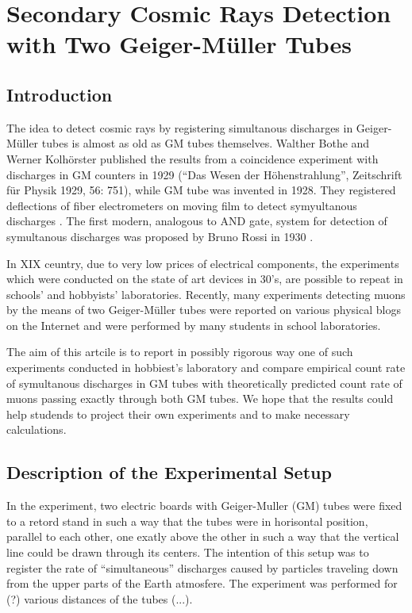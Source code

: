 \documentclass[main.tex]{subfiles}
\begin{document}
\section{Secondary Cosmic Rays Detection with Two Geiger-Müller Tubes}
\subsection{Introduction}
The idea to detect cosmic rays by registering simultanous discharges in Geiger-Müller tubes is almost as old as GM tubes themselves. Walther Bothe and Werner Kolhörster published the results from a coincidence experiment with discharges in GM counters in 1929 (“Das Wesen der Höhenstrahlung”, Zeitschrift für Physik 1929,
56: 751), while GM tube was invented in 1928. They registered deflections of fiber electrometers on moving film to detect symyultanous discharges \cite{congresso-nazionale-astronomia2005}.
The first modern, analogous to AND gate, system for detection of symultanous discharges was proposed by Bruno Rossi in 1930 \cite{rossi1930}.

In XIX ceuntry, due to very low prices of electrical components, the experiments which were conducted on the state of art devices in 30's, are possible to repeat in schools' and hobbyists' laboratories. Recently, many experiments detecting muons by the means of two Geiger-Müller tubes were reported on various physical blogs on the Internet and were performed by many students in school laboratories.

The aim of this artcile is to report in possibly rigorous way one of such experiments conducted in hobbiest's laboratory and compare empirical count rate of symultanous discharges in GM tubes with theoretically predicted count rate of muons passing exactly through both GM tubes. We hope that the results could help studends to project their own experiments and to make necessary calculations.   
\subsection{Description of the Experimental Setup}
In the experiment, two electric boards with Geiger-Muller (GM) tubes were fixed to a retord stand in such a way that the tubes were in horisontal position, parallel to each other, one exatly above the other in such a way that the vertical line could be drawn through its centers. The intention of this setup was to register the rate of ``simultaneous'' discharges caused by particles traveling down from the upper parts of the Earth atmosfere. The experiment was performed for (?) various distances of the tubes (...).
\end{document}
